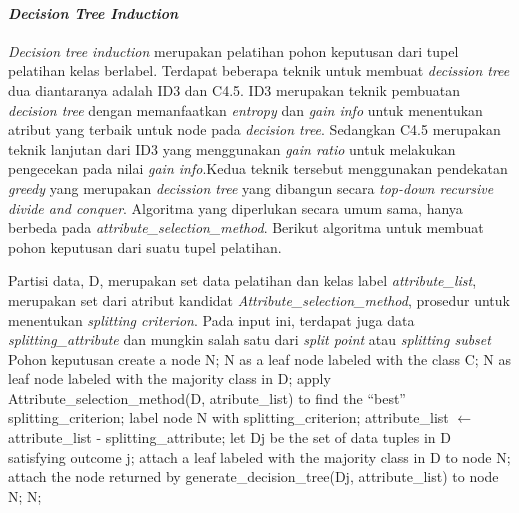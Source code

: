 \paragraph{\textsl{Decision Tree Induction}}

\textsl{Decision tree induction} merupakan pelatihan pohon keputusan dari tupel pelatihan kelas berlabel. Terdapat beberapa teknik untuk membuat \textsl{decission tree} dua diantaranya adalah ID3 dan C4.5. ID3 merupakan teknik pembuatan \textsl{decision tree} dengan memanfaatkan \textsl{entropy} dan \textsl{gain info} untuk menentukan atribut yang terbaik untuk node pada \textsl{decision tree}. Sedangkan C4.5 merupakan teknik lanjutan dari ID3 yang menggunakan \textsl{gain ratio} untuk melakukan pengecekan pada nilai \textsl{gain info}.Kedua teknik tersebut menggunakan pendekatan \textsl{greedy} yang merupakan \textsl{decission tree} yang dibangun secara \textsl{top-down recursive divide and conquer}. Algoritma yang diperlukan secara umum sama, hanya berbeda pada \textsl{attribute\_selection\_method}. Berikut algoritma untuk membuat pohon keputusan dari suatu tupel pelatihan.


\begin{algorithmic}[1]
	\REQUIRE Partisi data, D, merupakan set data pelatihan dan kelas label
	\REQUIRE \textsl{attribute\_list}, merupakan set dari atribut kandidat
	\REQUIRE \textsl{Attribute\_selection\_method}, prosedur untuk menentukan \textsl{splitting criterion}. Pada input ini, terdapat juga data \textsl{splitting\_attribute} dan mungkin salah satu dari \textsl{split point} atau \textsl{splitting subset}
	\ENSURE Pohon keputusan
	\STATE create a node N;
	  \RETURN N as a leaf node labeled with the class C;
	\ENDIF
		\RETURN  N as leaf node labeled with the majority class in D; 
	\ENDIF
	\STATE apply Attribute\_selection\_method(D, atribute\_list) to find the "`best"' splitting\_criterion;
	\STATE label node N with splitting\_criterion;
		\STATE attribute\_list $\leftarrow$ attribute\_list - splitting\_attribute; 
	\ENDIF
		\STATE let D\lowercase{j} be the set of data tuples in D satisfying outcome j; 
			\STATE attach a leaf labeled with the majority class in D to node N;
		\ELSE
			\STATE attach the node returned by generate\_decision\_tree(D\lowercase{j}, attribute\_list) to node N;
		\ENDIF
	\ENDFOR
\RETURN N;
\end{algorithmic}


